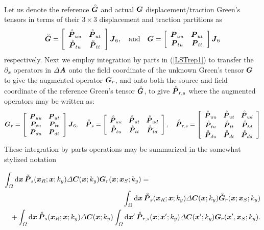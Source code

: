 Let us denote the reference ${\rf{\bmi G}}$ and actual ${{\bmi G}}$ 
displacement/traction Green's tensors in terms of their $3 \times 3$ 
displacement and traction partitions  as
\[
{\rf{\bmi G}}=\left[{\begin{array}{cc}
\rf{\bmi P}_{uu}&\rf{\bmi P}_{ut}\\ 
\rf{\bmi P}_{tu}&\rf{\bmi P}_{tt}
\end{array}}\right]{\bmi J}_{6}, \quad \mbox{and} \quad
{{\bmi G}}=\left[{\begin{array}{cc}
{\bmi P}_{uu}&{\bmi P}_{ut}\\ 
{\bmi P}_{tu}&{\bmi P}_{tt}
\end{array}}\right]{\bmi J}_{6}
\] 
respectively. 
Next we employ integration by parts in (\ref{LSTrep1}) to transfer the 
$\partial_{x}$ operators  in ${\mit \Delta} {\bmi A}$ onto the field 
coordinate of the unknown Green's tensor  ${{\bmi G}}$ to give the augmented 
operator ${{\bmi G}_{r}}$, and onto both the 
source and field coordinate of the reference  Green's tensor  ${\rf{\bmi 
G}}$, to give ${\rf{\bmi P}_{r,s}}$ where
the augmented operators may be written as:
\[{{\bmi G}_{r}}=\left[{\begin{array}{cc}{\bmi P}_{uu}&{\bmi P}_{ut}\\ 
{\bmi P}_{tu}&{\bmi P}_{tt}\\
{\bmi P}_{du}&{\bmi P}_{dt}\end{array}}\right]{\bmi J}_{6}
, \quad
{\rf{\bmi P}_{s}}=\left[{\begin{array}{ccc}
\rf{\bmi P}_{uu}&\rf{\bmi P}_{ut}&\rf{\bmi P}_{ud}\\ 
\rf{\bmi P}_{tu}&\rf{\bmi P}_{tt}&\rf{\bmi P}_{td}
\end{array}}\right]
, \quad
{\rf{\bmi P}_{r,s}}=\left[{\begin{array}{ccc}
\rf{\bmi P}_{uu}&\rf{\bmi P}_{ut}&\rf{\bmi P}_{ud}\\ 
\rf{\bmi P}_{tu}&\rf{\bmi P}_{tt}&\rf{\bmi P}_{td}\\
\rf{\bmi P}_{du}&\rf{\bmi P}_{dt}&\rf{\bmi P}_{dd}
\end{array}}\right]
\]
 These integration by parts 
operations may be summarized in the somewhat stylized notation 
\begin{samepage}
\begin{eqnarray} \label{LSTrep2}
\lefteqn{\int_{{\mit \Omega}} {\rm d}{\bmi x}\,{\rf{\bmi P}}_{s}({\bmi x}_{R};{\bmi x};k_y)
{\mit \Delta} {\bmi C}({\bmi
x};k_y){{\bmi G}}_{r}({\bmi x};{\bmi x}_{S};k_y)=}\nonumber\\
&&
\int_{{\mit \Omega}} {\rm d}{\bmi x}\,{\rf{\bmi P}}_{s}({\bmi x}_{R};{\bmi x};k_y)
{\mit \Delta} {\bmi C}({\bmi
x};k_y){\rf{\bmi G}}_{r}({\bmi x};{\bmi x}_{S};k_y)\\
&&+\int_{{\mit \Omega}} {\rm d}{\bmi x}\, {\rf{\bmi P}}_{s}({\bmi x}_{R};{\bmi x};k_y)
{\mit \Delta} {\bmi C}({\bmi
x};k_y)\int_{{\mit \Omega}}{\rm d}{\bmi x}^{\prime}\, 
{\rf{\bmi P}}_{r,s}({\bmi x};{\bmi x}^{\prime};k_y)
{\mit \Delta} {\bmi C}({\bmi
x}^{\prime};k_y) {\bmi G}_{r}({\bmi x}^{\prime},{\bmi 
x}_{S};k_y) .
\nonumber
\end{eqnarray}
\end{samepage}
